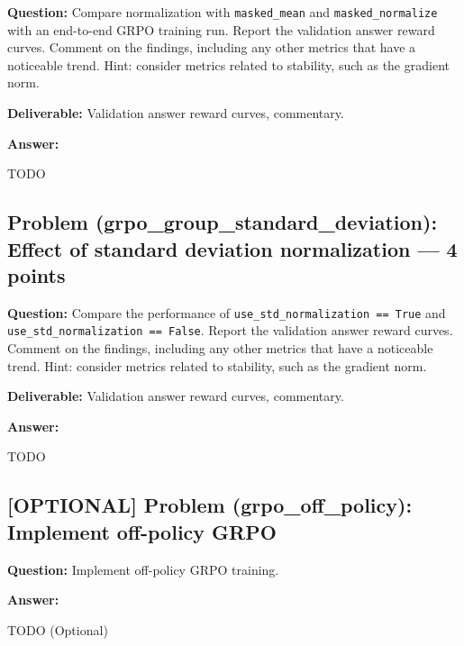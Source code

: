 \documentclass[11pt]{article}
\begin{document}
\textbf{Question:} Compare normalization with \texttt{masked\_mean} and \texttt{masked\_normalize} with an end-to-end GRPO training run. Report the validation answer reward curves. Comment on the findings, including any other metrics that have a noticeable trend. Hint: consider metrics related to stability, such as the gradient norm.

\textbf{Deliverable:} Validation answer reward curves, commentary.

\textbf{Answer:}


TODO

\subsection*{Problem (grpo\_group\_standard\_deviation): Effect of standard deviation normalization --- 4 points}

\textbf{Question:} Compare the performance of \texttt{use\_std\_normalization == True} and \texttt{use\_std\_normalization == False}. Report the validation answer reward curves. Comment on the findings, including any other metrics that have a noticeable trend. Hint: consider metrics related to stability, such as the gradient norm.

\textbf{Deliverable:} Validation answer reward curves, commentary.

\textbf{Answer:}


TODO

\subsection*{[OPTIONAL] Problem (grpo\_off\_policy): Implement off-policy GRPO}

\textbf{Question:} Implement off-policy GRPO training.

\textbf{Answer:}

TODO (Optional)
\end{document}
